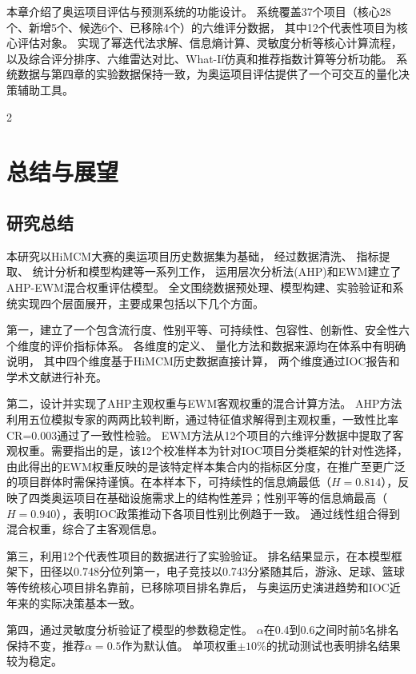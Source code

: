 \documentclass[twoside]{CUGThesis}
\begin{document}
本章介绍了奥运项目评估与预测系统的功能设计。
系统覆盖37个项目（核心28个、新增5个、候选6个、已移除4个）的六维评分数据，
其中12个代表性项目为核心评估对象。
实现了幂迭代法求解、信息熵计算、灵敏度分析等核心计算流程，
以及综合评分排序、六维雷达对比、What-If仿真和推荐指数计算等分析功能。
系统数据与第四章的实验数据保持一致，为奥运项目评估提供了一个可交互的量化决策辅助工具。


\begin{spacing}{2}\section{总结与展望}\end{spacing}

\subsection{研究总结}

本研究以HiMCM大赛的奥运项目历史数据集为基础，
经过数据清洗、
指标提取、
统计分析和模型构建等一系列工作，
运用层次分析法(AHP)和EWM建立了AHP-EWM混合权重评估模型。
全文围绕数据预处理、模型构建、实验验证和系统实现四个层面展开，主要成果包括以下几个方面。

第一，建立了一个包含流行度、性别平等、可持续性、包容性、创新性、安全性六个维度的评价指标体系。
各维度的定义、
量化方法和数据来源均在体系中有明确说明，
其中四个维度基于HiMCM历史数据直接计算，
两个维度通过IOC报告和学术文献进行补充。

第二，设计并实现了AHP主观权重与EWM客观权重的混合计算方法。
AHP方法利用五位模拟专家的两两比较判断，通过特征值求解得到主观权重，一致性比率CR=0.003通过了一致性检验。
EWM方法从12个项目的六维评分数据中提取了客观权重。需要指出的是，该12个校准样本为针对IOC项目分类框架的针对性选择，由此得出的EWM权重反映的是该特定样本集合内的指标区分度，在推广至更广泛的项目群体时需保持谨慎。在本样本下，可持续性的信息熵最低（$H=0.814$），反映了四类奥运项目在基础设施需求上的结构性差异；性别平等的信息熵最高（$H=0.940$），表明IOC政策推动下各项目性别比例趋于一致。
通过线性组合得到混合权重，综合了主客观信息。

第三，利用12个代表性项目的数据进行了实验验证。
排名结果显示，在本模型框架下，田径以0.748分位列第一，电子竞技以0.743分紧随其后，游泳、足球、篮球等传统核心项目排名靠前，已移除项目排名靠后，
与奥运历史演进趋势和IOC近年来的实际决策基本一致。

第四，通过灵敏度分析验证了模型的参数稳定性。
$\alpha$在0.4到0.6之间时前5名排名保持不变，推荐$\alpha = 0.5$作为默认值。
单项权重$\pm 10\%$的扰动测试也表明排名结果较为稳定。
\end{document}
